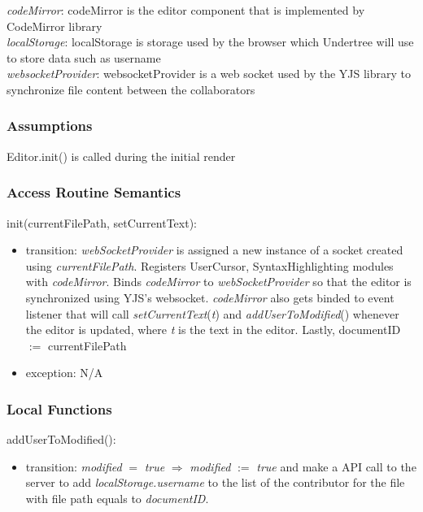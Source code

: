 \documentclass[12pt, titlepage]{article}
\begin{document}
	\textit{codeMirror}: codeMirror is the editor component that is implemented by CodeMirror library\\
	\textit{localStorage}: localStorage is storage used by the browser which Undertree will use to store data such as username \\
	\textit{websocketProvider}: websocketProvider is a web socket used by the YJS library to synchronize file content between the collaborators 
	
	\subsubsection{Assumptions}
	Editor.init() is called during the initial render
	
	\subsubsection{Access Routine Semantics}
	
	\noindent init(currentFilePath, setCurrentText):
	\begin{itemize}
		\item transition: \textit{webSocketProvider} is assigned a new instance of a socket created using \textit{currentFilePath}. Registers UserCursor, SyntaxHighlighting modules with \textit{codeMirror}. Binds \textit{codeMirror} to \textit{webSocketProvider} so that the editor is synchronized using YJS's websocket. \textit{codeMirror} also gets binded to event listener that will call \textit{setCurrentText}(\textit{t}) and \textit{addUserToModified}() whenever the editor is updated, where \textit{t} is the text in the editor. Lastly, documentID $:=$ currentFilePath
		\item exception: N/A
	\end{itemize}
	
	\subsubsection{Local Functions}
	
	\noindent addUserToModified():
	\begin{itemize}
		\item transition: \textit{modified} $=$ \textit{true} $\Rightarrow$ \textit{modified} $:=$ \textit{true} and make a API call to the server to add \textit{localStorage.username} to the list of the contributor for the file with file path equals to \textit{documentID}.
	\end{itemize}
	
\end{document}
